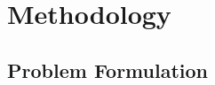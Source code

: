 \documentclass[conference]{IEEEtran}
\begin{document}




\section{Methodology}

\subsection{Problem Formulation}
\end{document}

